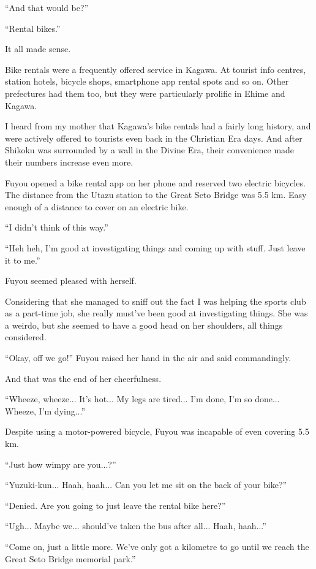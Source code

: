 ``And that would be?''

``Rental bikes.''

It all made sense.

Bike rentals were a frequently offered service in Kagawa. At tourist info centres, station hotels, bicycle shops, smartphone app rental spots and so on. Other prefectures had them too, but they were particularly prolific in Ehime and Kagawa.

I heard from my mother that Kagawa's bike rentals had a fairly long history, and were actively offered to tourists even back in the Christian Era days. And after Shikoku was surrounded by a wall in the Divine Era, their convenience made their numbers increase even more.

Fuyou opened a bike rental app on her phone and reserved two electric bicycles. The distance from the Utazu station to the Great Seto Bridge was 5.5 km. Easy enough of a distance to cover on an electric bike.

``I didn't think of this way.''

``Heh heh, I'm good at investigating things and coming up with stuff. Just leave it to me.''

Fuyou seemed pleased with herself.

Considering that she managed to sniff out the fact I was helping the sports club as a part-time job, she really must've been good at investigating things. She was a weirdo, but she seemed to have a good head on her shoulders, all things considered.

``Okay, off we go!'' Fuyou raised her hand in the air and said commandingly.

And that was the end of her cheerfulness.

``Wheeze, wheeze... It's hot... My legs are tired... I'm done, I'm so done... Wheeze, I'm dying...''

Despite using a motor-powered bicycle, Fuyou was incapable of even covering 5.5 km.

``Just how wimpy are you...?''

``Yuzuki-kun... Haah, haah... Can you let me sit on the back of your bike?''

``Denied. Are you going to just leave the rental bike here?''

``Ugh... Maybe we... should've taken the bus after all... Haah, haah...''

``Come on, just a little more. We've only got a kilometre to go until we reach the Great Seto Bridge memorial park.''


